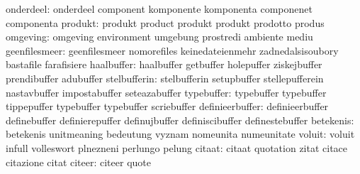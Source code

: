                        onderdeel: onderdeel                        component
                                  komponente                       komponenta
                                  componenet                       componenta
                         produkt: produkt                          product
                                  produkt                          produkt
                                  prodotto                         produs
                        omgeving: omgeving                         environment
                                  umgebung                         prostredi
                                  ambiente                         mediu
                   geenfilesmeer: geenfilesmeer                    nomorefiles
                                  keinedateienmehr                 zadnedalsisoubory
                                  bastafile                        farafisiere
                      haalbuffer: haalbuffer                       getbuffer
                                  holepuffer                       ziskejbuffer
                                  prendibuffer                     adubuffer
                    stelbufferin: stelbufferin                     setupbuffer
                                  stellepufferein                  nastavbuffer
                                  impostabuffer                    seteazabuffer
                      typebuffer: typebuffer                       typebuffer
                                  tippepuffer                      typebuffer
                                  typebuffer                       scriebuffer %
                 definieerbuffer: definieerbuffer                  definebuffer
                                  definierepuffer                  definujbuffer
                                  definiscibuffer                  definestebuffer
                       betekenis: betekenis                        unitmeaning
                                  bedeutung                        vyznam
                                  nomeunita                        numeunitate %
                          voluit: voluit                           infull
                                  volleswort                       plnezneni
                                  perlungo                         pelung
                          citaat: citaat                           quotation
                                  zitat                            citace
                                  citazione                        citat
                          citeer: citeer                           quote
